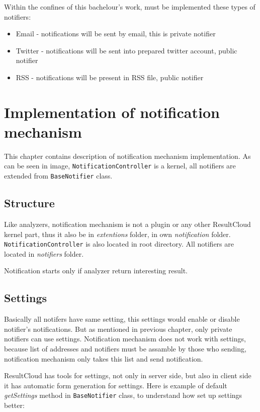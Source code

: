Within the confines of this bachelour's work, must be implemented these types of notifiers:
\begin{itemize} 
\item Email - notifications will be sent by email, this is private notifier
\item Twitter - notifications will be sent into prepared twitter account, public notifier
\item RSS - notifications will be present in RSS file, public notifier
\end{itemize}  

\chapter{Implementation of notification mechanism}
\label{ch:notification_implement}

This chapter contains description of notification mechanism implementation. As can be seen in image, \texttt{NotificationController} is a kernel, all notifiers are extended from \texttt{BaseNotifier} class.

\section{Structure}

Like analyzers, notification mechanism is not a plugin or any other ResultCloud kernel part, thus it also be in \emph{extentions} folder, in own \emph{notification} folder. \texttt{NotificationController} is also located in root directory. All notifiers are located in \emph{notifiers} folder.

Notification starts only if analyzer return interesting result.

\section{Settings}

Basically all notifers have same setting, this settings would enable or disable notifier's notifications. But as mentioned in previous chapter, only private notifiers can use settings. Notification mechanism does not work with settings, because list of addresses and notifiers must be assamble by those who sending, notification mechanism only takes this list and send notification. 

ResultCloud has tools for settings, not only in server side, but also in client side it has automatic form generation for settings. Here is example of default \emph{getSettings} method in \texttt{BaseNotifier} class, to understand how set up settings better:

